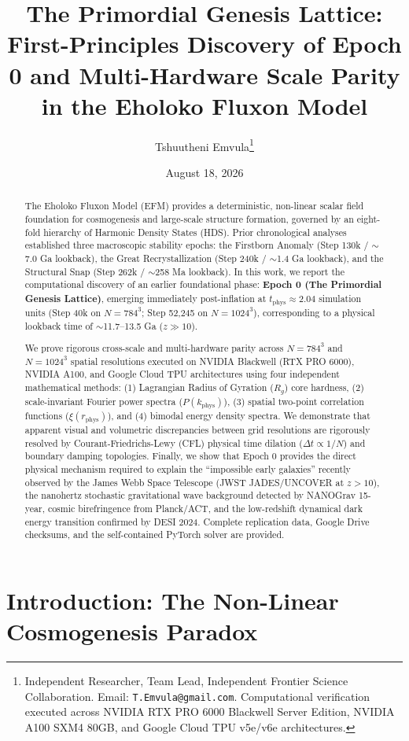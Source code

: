 \documentclass[11pt, twoside]{article}
\title{\textbf{The Primordial Genesis Lattice: First-Principles Discovery of Epoch 0 and Multi-Hardware Scale Parity in the Eholoko Fluxon Model}}
\author{Tshuutheni Emvula\thanks{Independent Researcher, Team Lead, Independent Frontier Science Collaboration. Email: \texttt{T.Emvula@gmail.com}. Computational verification executed across NVIDIA RTX PRO 6000 Blackwell Server Edition, NVIDIA A100 SXM4 80GB, and Google Cloud TPU v5e/v6e architectures.}}
\date{August 18, 2026}
\begin{document}
\maketitle
\thispagestyle{empty}

\begin{abstract}
The Eholoko Fluxon Model (EFM) provides a deterministic, non-linear scalar field foundation for cosmogenesis and large-scale structure formation, governed by an eight-fold hierarchy of Harmonic Density States (HDS). Prior chronological analyses established three macroscopic stability epochs: the Firstborn Anomaly (Step 130k / $\sim$7.0 Ga lookback), the Great Recrystallization (Step 240k / $\sim$1.4 Ga lookback), and the Structural Snap (Step 262k / $\sim$258 Ma lookback). In this work, we report the computational discovery of an earlier foundational phase: \textbf{Epoch 0 (The Primordial Genesis Lattice)}, emerging immediately post-inflation at $t_{\text{phys}} \approx 2.04$ simulation units (Step 40k on $N=784^3$; Step 52,245 on $N=1024^3$), corresponding to a physical lookback time of $\sim$11.7--13.5 Ga ($z \gg 10$).

We prove rigorous cross-scale and multi-hardware parity across $N=784^3$ and $N=1024^3$ spatial resolutions executed on NVIDIA Blackwell (RTX PRO 6000), NVIDIA A100, and Google Cloud TPU architectures using four independent mathematical methods: (1) Lagrangian Radius of Gyration ($R_g$) core hardness, (2) scale-invariant Fourier power spectra ($P(k_{\text{phys}})$), (3) spatial two-point correlation functions ($\xi(r_{\text{phys}})$), and (4) bimodal energy density spectra. We demonstrate that apparent visual and volumetric discrepancies between grid resolutions are rigorously resolved by Courant-Friedrichs-Lewy (CFL) physical time dilation ($\Delta t \propto 1/N$) and boundary damping topologies. Finally, we show that Epoch 0 provides the direct physical mechanism required to explain the ``impossible early galaxies'' recently observed by the James Webb Space Telescope (JWST JADES/UNCOVER at $z > 10$), the nanohertz stochastic gravitational wave background detected by NANOGrav 15-year, cosmic birefringence from Planck/ACT, and the low-redshift dynamical dark energy transition confirmed by DESI 2024. Complete replication data, Google Drive checksums, and the self-contained PyTorch solver are provided.
\end{abstract}

\clearpage
\tableofcontents
\clearpage

\section{Introduction: The Non-Linear Cosmogenesis Paradox}
\end{document}
